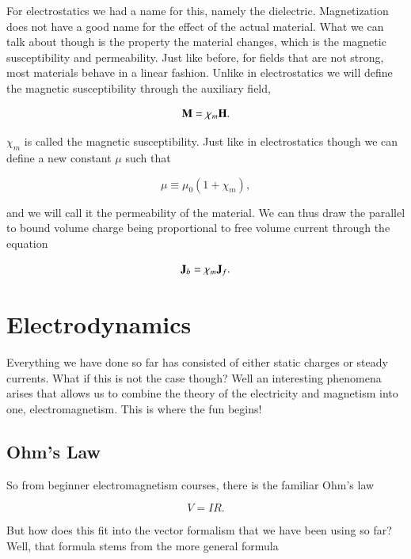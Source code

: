 \documentclass[preprint, review,12pt]{elsarticle}
\def\b{\textbf}
\def\={\equiv}
\begin{document}
For electrostatics we had a name for this, namely the dielectric. Magnetization does not have a good name for the effect of the actual material. What we can talk about though is the property the material changes, which is the magnetic susceptibility and permeability. Just like before, for fields that are not strong, most materials behave in a linear fashion. Unlike in electrostatics we will define the magnetic susceptibility through the auxiliary field,

\begin{equation}
    \b M = \chi_m \b H.
\end{equation}

$\chi_m$ is called the magnetic susceptibility. Just like in electrostatics though we can define a new constant $\mu$ such that

\begin{equation}
    \mu \= \mu_0(1+\chi_m),
\end{equation}

and we will call it the permeability of the material. We can thus draw the parallel to bound volume charge being proportional to free volume current through the equation

\begin{equation}
    \b J_b = \chi_m \b J_f.
\end{equation}

\section{Electrodynamics}

Everything we have done so far has consisted of either static charges or steady currents. What if this is not the case though? Well an interesting phenomena arises that allows us to combine the theory of the electricity and magnetism into one, electromagnetism. This is where the fun begins!

\subsection{Ohm's Law}

So from beginner electromagnetism courses, there is the familiar Ohm's law

\begin{equation}
    V = IR.
\end{equation}

But how does this fit into the vector formalism that we have been using so far? Well, that formula stems from the more general formula
\end{document}
